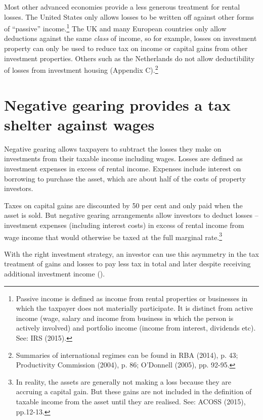 \documentclass{grattan}\usepackage[]{graphicx}\usepackage[]{color}
\begin{document}
Most other advanced economies provide a less generous treatment for
rental losses. The United States only allows losses to be written off
against other forms of ``passive'' income.\footnote{Passive income is
  defined as income from rental properties or businesses in which the
  taxpayer does not materially participate. It is distinct from active
  income (wage, salary and income from business in which the person is
  actively involved) and portfolio income (income from interest,
  dividends etc). See: IRS (2015).} The UK and many European countries
only allow deductions against the same \emph{class} of income, so for
example, losses on investment property can only be used to reduce tax on
income or capital gains from other investment properties. Others such as
the Netherlands do not allow deductibility of losses from investment
housing (Appendix C).\footnote{Summaries of international regimes can be
  found in RBA (2014), p. 43; Productivity Commission (2004), p. 86;
  O'Donnell (2005), pp. 92-95.}

\section{Negative gearing provides a tax shelter against
wages}\label{negative-gearing-provides-a-widely-used-tax-shelter-on-wages}

Negative gearing allows taxpayers to subtract the losses they make on investments from their taxable income including wages. Losses are defined as investment expenses in excess of rental income.  Expenses include interest on borrowing to purchase the asset, which are about half of the costs of property investors.  

Taxes on capital gains are discounted by 50 per cent and only paid when
the asset is sold. But negative gearing arrangements allow investors to
deduct losses -- investment expenses (including interest costs) in
excess of rental income from wage income that would otherwise be taxed
at the full marginal rate.\footnote{In reality, the assets are generally
  not making a loss because they are accruing a capital gain. But these
  gains are not included in the definition of taxable income from the
  asset until they are realised. See: ACOSS (2015), pp.12-13.}

With the right investment strategy, an investor can use this asymmetry
in the tax treatment of gains and losses to pay less tax in total and
later despite receiving additional investment income ().
\end{document}
